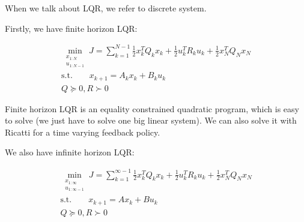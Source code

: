 \begin{center}
\end{center}

When we talk about LQR, we refer to discrete system. 

Firstly, we have finite horizon LQR: 

\begin{equation}
    \begin{aligned}
        \min_{\substack{x_{1:N}\\u_{1:N-1}}}J=\sum_{k=1}^{N-1}{\frac{1}{2}x_{k}^{T}Q_kx_k+\frac{1}{2}u_{k}^{T}R_ku_k}+\frac{1}{2}x_{N}^{T}Q_Nx_N \\
        \text{s.t.} \qquad x_{k+1} = A_k x_k + B_k u_k \\
        Q \succeq 0, R \succ 0 
    \end{aligned}
\end{equation}

Finite horizon LQR is an equality constrained quadratic program, which is easy to solve (we just have to solve one big linear system). We can also solve it with Ricatti for a time varying feedback policy. 

We also have infinite horizon LQR:

\begin{equation}
    \begin{aligned}
        \min_{\substack{x_{1:\infty}\\u_{1:\infty-1}}}J=\sum_{k=1}^{\infty-1}{\frac{1}{2}x_{k}^{T}Q_kx_k+\frac{1}{2}u_{k}^{T}R_ku_k}+\frac{1}{2}x_{N}^{T}Q_Nx_N \\
        \text{s.t.} \qquad x_{k+1} = A x_k + B u_k \\
        Q \succeq 0, R \succ 0 
    \end{aligned}
\end{equation}

